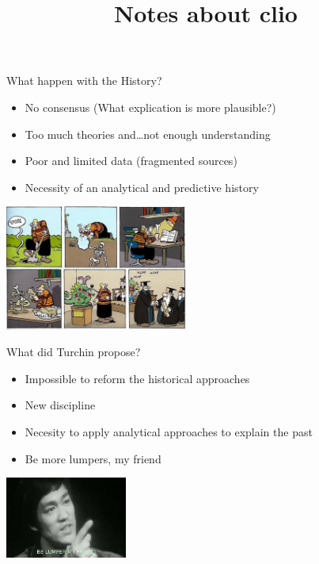 \documentclass{beamer}
\title{Notes about clio}
\begin{document}
    \section{\cite{turchin_arise_2008}}

    \begin{frame}{What happen with the History? }
	\begin{itemize}
	    \item  No consensus (What explication is more plausible?)
		   \item  Too much theories and\ldots not enough understanding 
		   \item  Poor and limited data (fragmented sources)
		   \item  Necessity of an analytical and predictive history
	\end{itemize}
	\begin{center}
	    \includegraphics[width=6cm]{images/1}
	\end{center}
    \end{frame}

    \begin{frame}{		What did Turchin propose? }
	\begin{itemize}
	    \item Impossible to reform the historical approaches
		   \item New discipline
		   \item Necesity to apply analytical approaches to explain the past
		   \item Be more lumpers, my friend
	\end{itemize}
	\begin{center}
	    \includegraphics[width=4cm]{images/2.jpg}
	\end{center}
    \end{frame}
\end{document}
